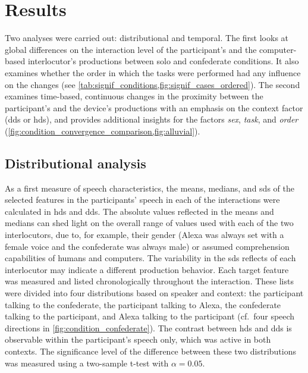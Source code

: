 \section{Results}
\label{sec:results_hhci}

Two analyses were carried out: distributional and temporal.
The first looks at global differences on the interaction level of the participant's and the computer-based interlocutor's productions between solo and confederate conditions.
It also examines whether the order in which the tasks were performed had any influence on the changes (see \cref{tab:signif_conditions,fig:signif_cases_ordered}).
The second examines time-based, continuous changes in the proximity between the participant's and the device's productions with an emphasis on the context factor (\ac{dds} or \ac{hds}), and provides additional insights for the factors \emph{sex}, \emph{task}, and \emph{order} (\cref{fig:condition_convergence_comparison,fig:alluvial}).

\subsection{Distributional analysis}
\label{subsec:distributional_analysis}

As a first measure of speech characteristics, the means, medians, and \aclp{sd} of the selected features in the participants' speech in each of the interactions were calculated in \ac{hds} and \ac{dds}.
The absolute values reflected in the means and medians can shed light on the overall range of values used with each of the two interlocutors, due to, for example, their gender (Alexa was always set with a female voice and the confederate was always male) or assumed comprehension capabilities of humans and computers.
The variability in the \aclp{sd} reflects of each interlocutor may indicate a different production behavior.
Each target feature was measured and listed chronologically throughout the interaction.
These lists were divided into four distributions based on speaker and context:
the participant talking to the confederate, the participant talking to Alexa, the confederate talking to the participant, and Alexa talking to the participant (cf.\ four speech directions in \cref{fig:condition_confederate}).
The contrast between \ac{hds} and \ac{dds} is observable within the participant's speech only, which was active in both contexts.
The significance level of the difference between these two distributions was measured using a two-sample t-test with $\alpha=0.05$.

